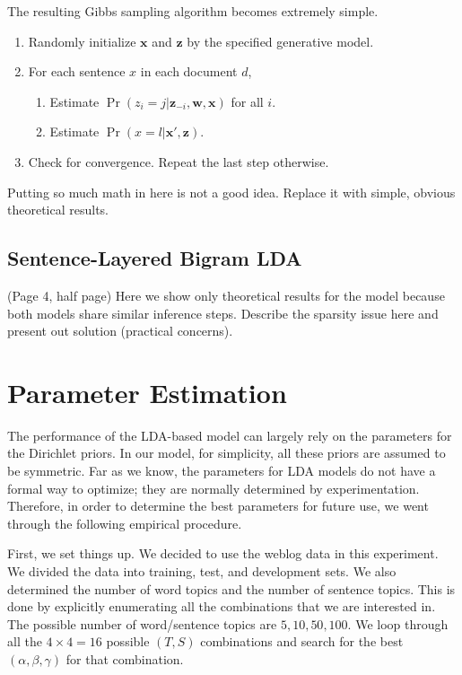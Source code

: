 The resulting Gibbs sampling algorithm becomes extremely simple.

\begin{enumerate}
  \item Randomly initialize $\mathbf{x}$ and $\mathbf{z}$ by the specified generative model.
  \item For each sentence $x$ in each document $d$, \begin{enumerate}
    \item Estimate $\Pr(z_i = j|\mathbf{z}_{-i}, \mathbf{w}, \mathbf{x})$ for all $i$.
    \item Estimate $\Pr(x = l|\mathbf{x}',\mathbf{z})$.
  \end{enumerate}
  \item Check for convergence.  Repeat the last step otherwise.
\end{enumerate}

{\color{red} Putting so much math in here is not a good idea.  Replace it with
simple, obvious theoretical results. }

\subsection{Sentence-Layered Bigram LDA} { \color{red} (Page 4, half page) Here we show only
theoretical results for the model because both models share similar inference
steps.  Describe the sparsity issue here and present out solution (practical
concerns). }

\section{Parameter Estimation}  The performance of the LDA-based model can
largely rely on the parameters for the Dirichlet priors.  In our model, for
simplicity, all these priors are assumed to be symmetric.  Far as we know, the
parameters for LDA models do not have a formal way to optimize; they are
normally determined by experimentation.  Therefore, in order to determine the
best parameters for future use, we went through the following empirical
procedure.  

First, we set things up.  We decided to use the weblog data in this experiment.
We divided the data into training, test, and development sets.  We also
determined the number of word topics and the number of sentence topics.  This
is done by explicitly enumerating all the combinations that we are interested
in.  The possible number of word/sentence topics are ${5, 10, 50, 100}$.   We
loop through all the $4 \times 4 = 16$ possible $(T,S)$ combinations and search
for the best $(\alpha, \beta, \gamma)$ for that combination.

